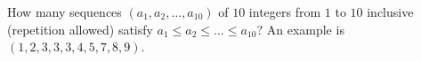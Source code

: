How many sequences $(a_1,a_2,\dots,a_{10})$ of $10$ integers from $1$ to $10$ inclusive (repetition allowed) satisfy $a_1\le a_2\le\dots\le a_{10}$? An example is $(1,2,3,3,3,4,5,7,8,9)$.
